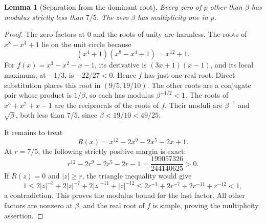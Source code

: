 \documentclass[11pt,a4paper]{article}
\newtheorem{lemma}[theorem]{Lemma}
\theoremstyle{definition}
\theoremstyle{remark}
\begin{document}
\begin{lemma}[Separation from the dominant root]\label{lem:gap}
Every zero of $p$ other than $\beta$ has modulus strictly less than $7/5$.
The zero $\beta$ has multiplicity one in $p$.
\end{lemma}
\begin{proof}
The zero factors at $0$ and the roots of unity are harmless. The roots of
$x^8-x^4+1$ lie on the unit circle because
\[
 (x^4+1)(x^8-x^4+1)=x^{12}+1.
\]
For $f(x)=x^3-x^2-x-1$, its derivative is $(3x+1)(x-1)$, and its local
maximum, at $-1/3$, is $-22/27<0$. Hence $f$ has just one real root.
Direct substitution places this root in $(9/5,19/10)$. The other roots
are a conjugate pair whose product is $1/\beta$, so each has modulus
$\beta^{-1/2}<1$. The roots of $x^3+x^2+x-1$ are the reciprocals of the
roots of $f$. Their moduli are $\beta^{-1}$ and $\sqrt\beta$, both less
than $7/5$, since $\beta<19/10<49/25$.

It remains to treat
\[
 R(x)=x^{12}-2x^9-2x^5-2x+1.
\]
At $r=7/5$, the following strictly positive margin is exact:
\begin{equation}\label{eq:radiusmargin}
 r^{12}-2r^9-2r^5-2r-1
 =\frac{199057326}{244140625}>0.
\end{equation}
If $R(z)=0$ and $|z|\ge r$, the triangle inequality would give
\[
 1\le 2|z|^{-3}+2|z|^{-7}+2|z|^{-11}+|z|^{-12}
 \le 2r^{-3}+2r^{-7}+2r^{-11}+r^{-12}<1,
\]
a contradiction. This proves the modulus bound for the last factor.
All other factors are nonzero at $\beta$, and the real root of $f$ is
simple, proving the multiplicity assertion.
\end{proof}
\end{document}
